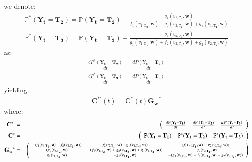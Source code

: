 we denote:
\begin{eqnarray}
\label{eqAnn2_5.8} \mathbb{P}^*(\mathbf{Y_t}=\mathbf{T_2})=\mathbb{P}(\mathbf{Y_t}=\mathbf{T_2})-\frac{g_1(v_{1,\mathbf{T_4}}, \mathbf{w})}{f_1(v_{1,\mathbf{T_2}}, \mathbf{w})+g_2(v_{2,\mathbf{T_2}}, \mathbf{w})+g_1(v_{1,\mathbf{T_4}}, \mathbf{w})} \\
\label{eqAnn2_5.9} \mathbb{P}^*(\mathbf{Y_t}=\mathbf{T_3})=\mathbb{P}(\mathbf{Y_t}=\mathbf{T_3})-\frac{g_2(v_{2,\mathbf{T_4}}, \mathbf{w})}{g_1(v_{1,\mathbf{T_3}}, \mathbf{w})+f_2(v_{2,\mathbf{T_3}}, \mathbf{w})+g_2(v_{2,\mathbf{T_4}}, \mathbf{w})}
\end{eqnarray}
as:
\begin{eqnarray}
\frac{dP^*(\mathbf{Y_t}=\mathbf{T_2})}{dt}=\frac{dP(\mathbf{Y_t}=\mathbf{T_2})}{dt} \\
\frac{dP^*(\mathbf{Y_t}=\mathbf{T_3})}{dt}=\frac{dP(\mathbf{Y_t}=\mathbf{T_3})}{dt}
\end{eqnarray}
yielding:
\begin{eqnarray}
\label{eqAnn2_5.12} \mathbf{C}^{*'}(t)=\mathbf{C}^*(t)\mathbf{G_w}^*
\end{eqnarray}
where:
\begin{eqnarray}
\nonumber
\mathbf{C}^{*'}&=&\left(\begin{array}{ccc} \frac{d\mathbb{P}(\mathbf{Y_t}=\mathbf{T_1})}{dt} & \frac{d\mathbb{P}^*(\mathbf{Y_t}=\mathbf{T_2})}{dt} & \frac{d\mathbb{P}^*(\mathbf{Y_t}=\mathbf{T_3})}{dt} \end{array}\right) \\
%
\nonumber \mathbf{C}^{*}&=&\left(\begin{array}{ccc} \mathbb{P}(\mathbf{Y_t}=\mathbf{T_1}) & \mathbb{P}^*(\mathbf{Y_t}=\mathbf{T_2}) & \mathbb{P}^*(\mathbf{Y_t}=\mathbf{T_3}) \end{array}\right) \\
%
\nonumber \mathbf{G_w}^*&=& \scriptsize{
\left(\begin{array}{cccc}
-(f_1(v_{1,\mathbf{T_1}}, \mathbf{w})+f_2(v_{2,\mathbf{T_1}}, \mathbf{w})) & f_2(v_{2,\mathbf{T_1}}, \mathbf{w})-g_1(v_{1,\mathbf{T_4}}, \mathbf{w})) & (f_1(v_{1,\mathbf{T_1}}, \mathbf{w})-g_2(v_{2,\mathbf{T_4}}, \mathbf{w})) \\
(g_2(v_{2,\mathbf{T_2}}, \mathbf{w})  & -(f_1(v_{1,\mathbf{T_2}}, \mathbf{w})+g_2(v_{2,\mathbf{T_2}}, \mathbf{w})+g_1(v_{1,\mathbf{T_4}}, \mathbf{w})) & -g_2(v_{2,\mathbf{T_4}}, \mathbf{w})  \\
g_1(v_{1,\mathbf{T_3}}, \mathbf{w}) & -g_1(v_{1,\mathbf{T_4}}, \mathbf{w})  & -(g_1(v_{1,\mathbf{T_3}}, \mathbf{w})+f_2(v_{2,\mathbf{T_3}}, \mathbf{w})+g_2(v_{2,\mathbf{T_4}}, \mathbf{w}))
\end{array}\right)}
\end{eqnarray}
